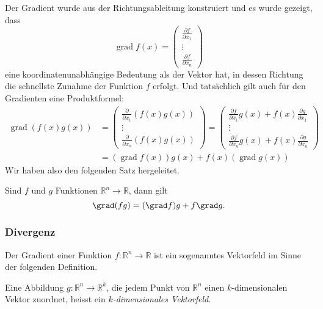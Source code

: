 Der Gradient wurde aus der Richtungsableitung konstruiert und es wurde
gezeigt, dass 
\[
\operatorname{grad} f(x)
=
\begin{pmatrix}
\frac{\partial f}{\partial x_1}\\
\vdots\\
\frac{\partial f}{\partial x_n}
\end{pmatrix}
\]
eine koordinatenunabhängige Bedeutung als der Vektor hat, in dessen
Richtung die schnellste Zunahme der Funktion $f$ erfolgt.
Und tatsächlich gilt auch für den Gradienten eine Produktformel:
\begin{align*}
\operatorname{grad}(f(x)g(x))
&=
\begin{pmatrix}
\frac{\partial}{\partial x_1}(f(x)g(x))\\
\vdots\\
\frac{\partial}{\partial x_n}(f(x)g(x))
\end{pmatrix}
=
\begin{pmatrix}
\frac{\partial f}{\partial x_1} g(x)
+
f(x) \frac{\partial g}{\partial x_1}\\
\vdots\\
\frac{\partial f}{\partial x_n} g(x)
+
f(x) \frac{\partial g}{\partial x_n}
\end{pmatrix}
\\
&=
(\operatorname{grad}f(x)) g(x)
+
f(x)(\operatorname{grad}g(x))
\end{align*}
Wir haben also den folgenden Satz hergeleitet.

\begin{satz}
Sind $f$ und $g$ Funktionen $\mathbb{R}^n \to\mathbb{R}$, dann gilt
\[
\grad (fg) = (\grad f)g + f\grad g.
\]
\end{satz}

%
%
\subsubsection{Divergenz}
Der Gradient einer Funktion $f\colon\mathbb{R}^n\to\mathbb{R}$ ist
ein sogenanntes Vektorfeld im Sinne der folgenden Definition.

\begin{definition}[Vektorfeld]
\label{buch:felder:fundamentallemma:def:vektorfeld}
Eine Abbildung $g\colon\mathbb{R}^n\to\mathbb{R}^k$, die jedem Punkt
von $\mathbb{R}^n$ einen $k$-dimensionalen Vektor zuordnet, heisst
ein {\em $k$-dimensionales Vektorfeld}.
\end{definition}

